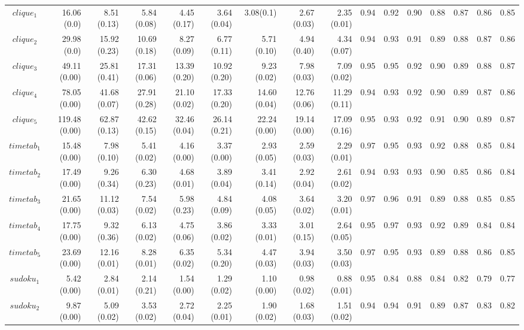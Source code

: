 \documentclass[preprint]{tlp}
\begin{document}
\begin{landscape}
\begin{tabular}{@{\extracolsep{\fill}}|c|r|r|r|r|r|r|r|r||r|r|r|r|r|r|r|}
\cline{1-16}
$clique_1$ & 16.06 (0.0) & 8.51 (0.13) & 5.84 (0.08) & 4.45 (0.17) & 3.64 (0.04) & 3.08(0.1) & 2.67 (0.03) & 2.35 (0.01)&0.94 & 0.92 & 0.90 & 0.88 & 0.87 & 0.86 & 0.85 \\
$clique_2$ & 29.98 (0.0) & 15.92 (0.23) & 10.69 (0.18) & 8.27 (0.09) & 6.77 (0.11) & 5.71 (0.10) & 4.94 (0.40) & 4.34 (0.07)&0.94 & 0.93 & 0.91 & 0.89 & 0.88 & 0.87 & 0.86 \\
$clique_3$ & 49.11 (0.00) & 25.81 (0.41) & 17.31 (0.06) & 13.39 (0.20) & 10.92 (0.20) & 9.23 (0.02) & 7.98 (0.03) & 7.09 (0.02)& 0.95 & 0.95 & 0.92 & 0.90 & 0.89 & 0.88 & 0.87 \\
$clique_4$ & 78.05 (0.00) & 41.68 (0.07) & 27.91 (0.28) & 21.10 (0.02) & 17.33 (0.20) & 14.60 (0.04) & 12.76 (0.06) & 11.29 (0.11)& 0.94 & 0.93 & 0.92 & 0.90 & 0.89 & 0.87 & 0.86 \\
$clique_5$ & 119.48 (0.00) & 62.87 (0.13) & 42.62 (0.15) & 32.46 (0.04) & 26.14 (0.21) & 22.24 (0.00) & 19.14 (0.00) & 17.09 (0.16)& 0.95 & 0.93 & 0.92 & 0.91 & 0.90 & 0.89 & 0.87 \\
\cline{1-16}
$timetab_1$ & 15.48 (0.00) & 7.98 (0.10) & 5.41 (0.02) & 4.16 (0.00) & 3.37 (0.00) & 2.93 (0.05) & 2.59 (0.03) & 2.29 (0.01)& 0.97 & 0.95 & 0.93 & 0.92 & 0.88 & 0.85 & 0.84  \\
$timetab_2$ & 17.49 (0.00) & 9.26 (0.34) & 6.30 (0.23) & 4.68 (0.01) & 3.89 (0.04) & 3.41 (0.14) & 2.92 (0.04) & 2.61 (0.02)& 0.94 & 0.93 & 0.93 & 0.90 & 0.85 & 0.86 & 0.84 \\
$timetab_3$ & 21.65 (0.00) & 11.12 (0.03) & 7.54 (0.02) & 5.98 (0.23) & 4.84 (0.09) & 4.08 (0.05) & 3.64 (0.02) & 3.20 (0.01)& 0.97 & 0.96 & 0.91 & 0.89 & 0.88 & 0.85 & 0.85 \\
$timetab_4$ & 17.75 (0.00) & 9.32 (0.36) & 6.13 (0.02) & 4.75 (0.06) & 3.86 (0.02) & 3.33 (0.01) & 3.01 (0.15) & 2.64 (0.05)& 0.95 & 0.97 & 0.93 & 0.92 & 0.89 & 0.84 & 0.84 \\
$timetab_5$ & 23.69 (0.00) & 12.16 (0.01) & 8.28 (0.01) & 6.35 (0.02) & 5.34 (0.20) & 4.47 (0.03) & 3.94 (0.03) & 3.50 (0.03)& 0.97 & 0.95 & 0.93 & 0.89 & 0.88 & 0.86 & 0.85 \\
\cline{1-16}
$sudoku_1$ & 5.42 (0.00) & 2.84 (0.01) & 2.14 (0.21) & 1.54 (0.00) & 1.29 (0.02) & 1.10 (0.00) & 0.98 (0.02) & 0.88 (0.01)& 0.95 & 0.84 & 0.88 & 0.84 & 0.82 & 0.79 & 0.77 \\
$sudoku_2$ & 9.87 (0.00) & 5.09 (0.02) & 3.53 (0.02) & 2.72 (0.04) & 2.25 (0.01) & 1.90 (0.02) & 1.68 (0.03) & 1.51 (0.02)& 0.94 & 0.94 & 0.91 & 0.89 & 0.87 & 0.83 & 0.82 \\

\end{tabular}
\end{landscape}
\end{document}
